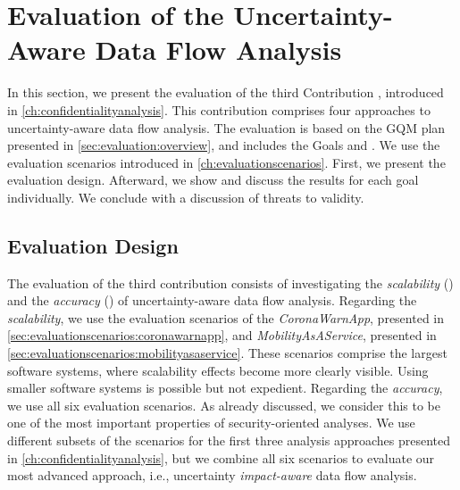 \section{Evaluation of the Uncertainty-Aware Data Flow Analysis}%
\label{sec:evaluation:third}

In this section, we present the evaluation of the third Contribution , introduced in \autoref{ch:confidentialityanalysis}.
This contribution comprises four approaches to uncertainty-aware data flow analysis.
The evaluation is based on the \ac{GQM} plan presented in \autoref{sec:evaluation:overview}, and includes the Goals  and .
We use the evaluation scenarios introduced in \autoref{ch:evaluationscenarios}.
First, we present the evaluation design.
Afterward, we show and discuss the results for each goal individually.
We conclude with a discussion of threats to validity.


\subsection{Evaluation Design}

The evaluation of the third contribution  consists of investigating the \emph{scalability} () and the \emph{accuracy} () of uncertainty-aware data flow analysis.
Regarding the \emph{scalability}, we use the evaluation scenarios of the \emph{CoronaWarnApp}, presented in \autoref{sec:evaluationscenarios:coronawarnapp}, and \emph{MobilityAsAService}, presented in \autoref{sec:evaluationscenarios:mobilityasaservice}.
These scenarios comprise the largest software systems, where scalability effects become more clearly visible.
Using smaller software systems is possible but not expedient.
Regarding the \emph{accuracy}, we use all six evaluation scenarios.
As already discussed, we consider this to be one of the most important properties of security-oriented analyses.
We use different subsets of the scenarios for the first three analysis approaches presented in \autoref{ch:confidentialityanalysis}, but we combine all six scenarios to evaluate our most advanced approach, i.e., uncertainty \emph{impact-aware} data flow analysis.

